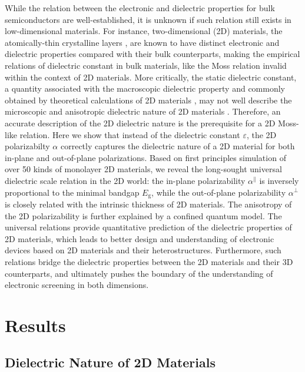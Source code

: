 \documentclass[journal=ancac3,manuscript=article,email=true,hyperref=true,keywords=false]{achemso}
\begin{document}
While the relation between the electronic and dielectric properties
for bulk semiconductors are well-established, it is unknown if such
relation still exists in low-dimensional materials. For instance,
two-dimensional (2D) materials, the atomically-thin crystalline layers
\cite{Novoselov_2016}, are known to have distinct electronic
\cite{Mak_2010,Tran_2014} and dielectric properties
\cite{Keldysh_1979_eps_multi,Sharma_1985} compared with their bulk
counterparts, making the empirical relations of dielectric constant in
bulk materials, like the Moss relation invalid within the context of
2D materials. More critically, the static dielectric constant, a
quantity associated with the macroscopic dielectric property and
commonly obtained by theoretical calculations of 2D materials
\cite{Ramasubramaniam_2012,Wang_2016_Aip,Laturia_2018}, may not well
describe the microscopic and anisotropic dielectric nature of 2D
materials
\cite{Cudazzo_2010_screen2D,Cudazzo_2011_screening_2D}. Therefore, an
accurate description of the 2D dielectric nature is the prerequisite
for a 2D Moss-like relation. Here we show that instead of the
dielectric constant $\varepsilon$, the 2D polarizabilty $\alpha$
correctly captures the dielectric nature of a 2D material for both
in-plane and out-of-plane polarizations. Based on first principles
simulation of over 50 kinds  of monolayer 2D
materials, we reveal the long-sought universal dielectric scale
relation in the 2D world: the in-plane polarizability
$\alpha^{\parallel}$ is inversely proportional to the minimal bandgap
$E_{\mathrm{g}}$, while the out-of-plane polarizability
$\alpha^{\perp}$ is closely related with the intrinsic thickness of 2D
materials. The anisotropy of the 2D polarizability is further
explained by a confined quantum model. The universal relations provide
quantitative prediction of the dielectric properties of 2D materials,
which leads to better design and understanding of electronic devices
based on 2D materials and their heterostructures. Furthermore, such
relations bridge the dielectric properties between the 2D materials
and their 3D counterparts, and ultimately pushes the boundary of the
understanding of electronic screening in both dimensions.

\section{Results}
\label{sec:org752ca78}

\subsection{Dielectric Nature of 2D Materials}
\label{sec:2d}
\end{document}
